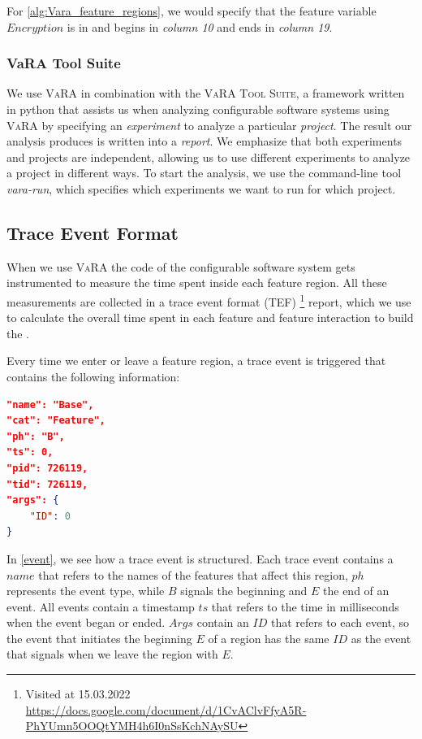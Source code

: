 For \autoref{alg:Vara_feature_regions}, we would specify that the feature variable
$Encryption$ is in  and begins in \emph{column 10} and ends in \emph{column 19}.

\subsubsection{VaRA Tool Suite}
We use \textsc{VaRA} in combination with the \textsc{VaRA Tool Suite}, a framework written in python that assists us 
when analyzing configurable software systems using \textsc{VaRA} by specifying an \emph{experiment} to analyze a particular \emph{project}. 
The result our analysis produces is written into a \emph{report}. We emphasize that both experiments and projects are independent, 
allowing us to use different experiments to analyze a project in different ways.
To start the analysis, we use the command-line tool \emph{vara-run}, which specifies which experiments we want to run for which project.

\subsection{Trace Event Format}\label{ch:trace-event}
When we use \textsc{VaRA} the code of the configurable software system gets instrumented to measure the time spent inside each feature region.
All these measurements are collected in a trace event format (TEF)
\footnote{Visited at 15.03.2022 \\ \url{https://docs.google.com/document/d/1CvAClvFfyA5R-PhYUmn5OOQtYMH4h6I0nSsKchNAySU}} report,
which we use to calculate the overall time spent in each feature and feature interaction to build the {\perfInfluenceModel}.

Every time we enter or leave a feature region, a trace event is triggered that contains the following information:\\

\begin{minipage}{\linewidth}
\begin{lstlisting}[caption={Example of a feature region trace entry in the TEF file},captionpos=b,language=json,firstnumber=1,label={event}]
"name": "Base",
"cat": "Feature",
"ph": "B",
"ts": 0,
"pid": 726119,
"tid": 726119,
"args": {
    "ID": 0
}
\end{lstlisting}
\end{minipage}
In \autoref{event}, we see how a trace event is structured. Each trace event contains a $name$ that refers to the names of the features that affect this
region, $ph$ represents the event type, while $B$ signals the beginning and $E$ the end of an event.
All events contain a timestamp $ts$ that refers to the time in milliseconds when the event began or ended.
$Args$ contain an $ID$ that refers to each event, so the event that initiates the beginning $E$ of a region has the same $ID$ as the event that signals when
we leave the region with $E$.

